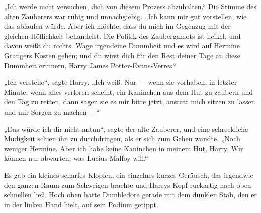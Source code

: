 \begin{em}
„Ich werde nicht versuchen, dich von diesem Prozess abzuhalten.“ Die Stimme des alten Zauberers war ruhig und unnachgiebig.
„Ich kann mir gut vorstellen, wie das ablaufen würde. Aber ich möchte, dass du mich im Gegenzug mit der gleichen Höflichkeit behandelst. Die Politik des Zaubergamots ist heikel, und davon weißt du nichts. Wage irgendeine Dummheit und es wird auf Hermine Grangers Kosten gehen; und du wirst dich für den Rest deiner Tage an diese Dummheit erinnern, Harry James Potter-Evans-Verres.“

„Ich verstehe“, sagte Harry.
„Ich weiß. Nur — wenn sie vorhaben, in letzter Minute, wenn alles verloren scheint, ein Kaninchen aus dem Hut zu zaubern und den Tag zu retten, dann sagen sie es mir bitte jetzt, anstatt mich sitzen zu lassen und mir Sorgen zu machen —“

„Das würde ich dir nicht antun“, sagte der alte Zauberer, und eine schreckliche Müdigkeit schien ihn zu durchdringen, als er sich zum Gehen wandte.
„Noch weniger Hermine. Aber ich habe keine Kaninchen in meinem Hut, Harry. Wir können nur abwarten, was Lucius Malfoy will.“
\end{em}

Es gab ein kleines scharfes Klopfen, ein einzelnes kurzes Geräusch, das irgendwie den ganzen Raum zum Schweigen brachte und Harrys Kopf ruckartig nach oben schnellen ließ. Hoch oben hatte Dumbledore gerade mit dem dunklen Stab, den er in der linken Hand hielt, auf sein Podium getippt.

